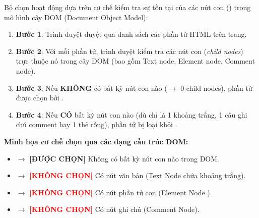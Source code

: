 \begin{conceptBox}
Bộ chọn  hoạt động dựa trên cơ chế kiểm tra sự tồn tại của các nút con () trong mô hình cây DOM (Document Object Model):
\begin{enumerate}[leftmargin=1.5em, itemsep=3pt, parsep=0pt]
    \item \textbf{Bước 1}: Trình duyệt duyệt qua danh sách các phần tử HTML trên trang.
    \item \textbf{Bước 2}: Với mỗi phần tử, trình duyệt kiểm tra các nút con (\textit{child nodes}) trực thuộc nó trong cây DOM (bao gồm Text node, Element node, Comment node).
    \item \textbf{Bước 3}: Nếu \textbf{KHÔNG} có bất kỳ nút con nào ($\rightarrow$ 0 child nodes), phần tử được chọn bởi .
    \item \textbf{Bước 4}: Nếu \textbf{CÓ} bất kỳ nút con nào (dù chỉ là 1 khoảng trắng, 1 câu ghi chú comment hay 1 thẻ rỗng), phần tử bị loại khỏi .
\end{enumerate}
\par\vspace{4pt}
\textbf{Minh họa cơ chế chọn qua các dạng cấu trúc DOM:}
\begin{itemize}[leftmargin=1.5em, itemsep=2pt, parsep=0pt]
    \item {} $\rightarrow$ \textcolor{green!60!black}{\textbf{[ĐƯỢC CHỌN]}} Không có bất kỳ nút con nào trong DOM.
    \item {} $\rightarrow$ \textcolor{red}{\textbf{[KHÔNG CHỌN]}} Có nút văn bản (Text Node chứa khoảng trắng).
    \item {} $\rightarrow$ \textcolor{red}{\textbf{[KHÔNG CHỌN]}} Có nút phần tử con (Element Node ).
    \item {} $\rightarrow$ \textcolor{red}{\textbf{[KHÔNG CHỌN]}} Có nút ghi chú (Comment Node).
\end{itemize}
\end{conceptBox}

